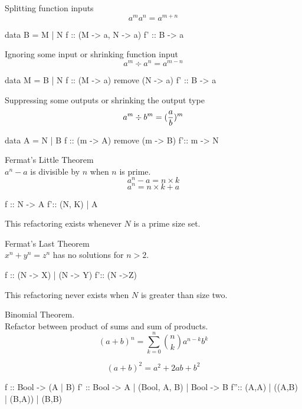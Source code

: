 \documentclass{beamer}
\begin{document}
\begin{frame}[fragile]
Splitting function inputs
$$a^{m}a^{n} = a^{m+n}$$
\begin{code}
data B = M | N
f :: (M -> a, N -> a)
f' :: B -> a
\end{code}
\end{frame}

\begin{frame}[fragile]
Ignoring some input or shrinking function input 
$$ a^{m} \div a^{n} = a^{m-n}$$
\begin{code}
data M = B | N
f :: (M -> a) remove (N -> a)
f' :: B -> a
\end{code}
\end{frame}

\begin{frame}[fragile]
Suppressing some outputs or shrinking the output type
$$ a^{m} \div b^{m} = ({a \over b})^{m}$$
\begin{code}
data A = N | B
f :: (m -> A) remove (m -> B)
f':: m -> N
\end{code}
\end{frame}


\begin{frame}[fragile]
Fermat's Little Theorem\\
$ a^{n} - a$ is divisible by $n$ when $n$ is prime.
$$ a^{n} - a = n\times k$$
$$ a^{n} = n\times k + a$$
\begin{code}
f :: N -> A
f':: (N, K) | A
\end{code}
This refactoring exists whenever $N$ is a prime size set.
\end{frame}

\begin{frame}[fragile]
Fermat's Last Theorem\\

$ x^{n} + y^{n} = z^{n} $ has no solutions for $n>2$.\newline

\begin{code}
f :: (N -> X) | (N -> Y)
f':: (N ->Z)
\end{code}
This refactoring never exists when $N$ is greater than size two.
\end{frame}


\begin{frame}[fragile]
Binomial Theorem.  \\ Refactor between product of sums and sum of products.
$$(a+b)^{n} = \sum_{k=0}^{n}{n \choose k} a^{n-k}b^{k}$$

$$(a+b)^{2} = a^{2} + 2ab + b^{2}$$
\begin{code}
f :: Bool -> (A | B)
f' :: Bool -> A
      | (Bool, A, B)
      | Bool -> B 
f'':: (A,A) | ((A,B) | (B,A)) | (B,B)
 
      
\end{code}
\end{frame}
\end{document}
